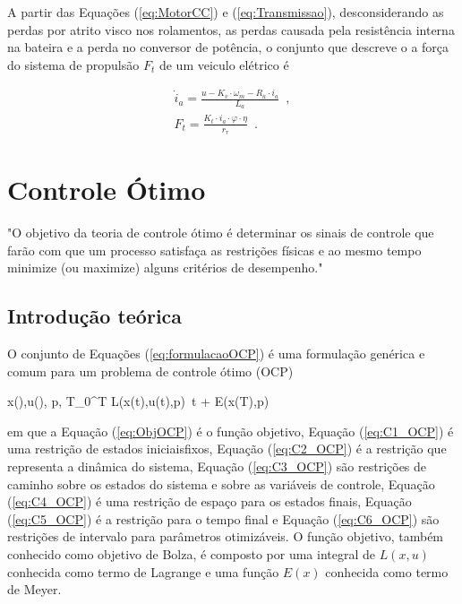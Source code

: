 A partir das Equações (\ref{eq:MotorCC}) e (\ref{eq:Transmissao}), desconsiderando as perdas por atrito visco nos rolamentos, as perdas causada pela resistência interna na bateira e
a perda no conversor de potência, o conjunto que descreve o a força do sistema de propulsão $F_t$ de um veiculo elétrico é

\begin{subequations}
	\label{eq:propulsao}
	\begin{align}
		\dot i_{a} = \frac{u - K_{v} \cdot \omega_{m} - R_{a} \cdot i_{a}}{L_{a}}\enspace, \label{eq:propulsao_1} \\
		F_{t} =  \frac{K_t \cdot i_a \cdot \varphi \cdot \eta}{r_r}\enspace. \label{eq:propulsao_2}
	\end{align}
\end{subequations}

\section{Controle Ótimo}

"O objetivo da teoria de controle ótimo é determinar os sinais de controle que farão com que um processo satisfaça as restrições físicas e ao mesmo
tempo minimize
(ou maximize) alguns critérios de desempenho."~\cite[Cap.~1]{book:Kirk}

\subsection{Introdução teórica}

O conjunto de Equações (\ref{eq:formulacaoOCP}) é uma formulação genérica e comum para um problema de controle ótimo (OCP)


\begin{mini!}
	{x(\cdot),u(\cdot), p, T}{\int_{0}^{T} L(x(t),u(t),p) \,t \;+\; E(x(T),p) \label{eq:ObjOCP}}
	{\label{eq:formulacaoOCP}}{}
\end{mini!}

em que a Equação (\ref{eq:ObjOCP}) é o função objetivo, Equação (\ref{eq:C1_OCP}) é uma restrição de estados iniciaisfixos, Equação (\ref{eq:C2_OCP}) é
a restrição
que representa a dinâmica
do sistema, Equação (\ref{eq:C3_OCP}) são restrições de caminho sobre os estados do sistema e sobre as variáveis de controle, Equação (\ref{eq:C4_OCP})
é uma restrição de espaço para os estados finais, Equação (\ref{eq:C5_OCP}) é a restrição para o tempo final e Equação (\ref{eq:C6_OCP}) são restrições de intervalo para parâmetros otimizáveis.
O função objetivo, também conhecido como objetivo de Bolza, é composto por uma integral de $L(x,u)$ conhecida como termo de Lagrange
e uma função $E(x)$ conhecida como termo de Meyer. \cite[Cap.~9]{book:Numerical_Optimal_Control}

